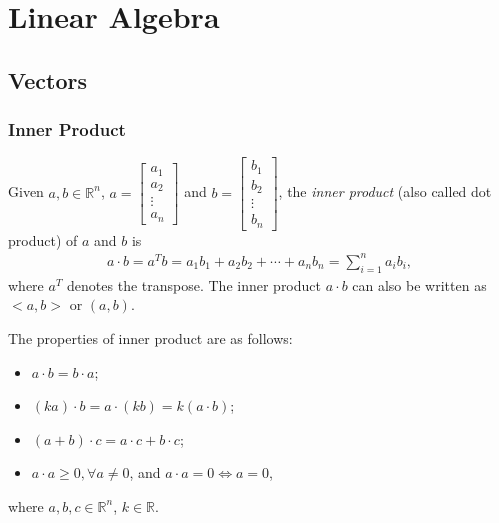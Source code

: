 \section*{Linear Algebra}
\subsection*{Vectors}
\subsubsection*{Inner Product}
Given $a, b \in \mathbb{R}^n$,
$ a = \begin{bmatrix}
a_1 \\
a_2  \\
\vdots \\
a_n
\end{bmatrix}$ and
$ b = \begin{bmatrix}
b_1 \\
b_2 \\
\vdots \\
b_n
\end{bmatrix}$, the \emph{inner product} (also called dot product) of $a$ and $b$ is
\begin{align*}
a \cdot b = a^T b = a_1 b_1 + a_2 b_2 + \cdots + a_n b_n = \sum_{i=1}^n a_i b_i,
\end{align*}
where $a^T$ denotes the transpose. The inner product $a \cdot b$ can also be written as $<a, b>$ or $(a, b)$.

The properties of inner product are as follows:
\begin{itemize}
  \item $a \cdot b = b \cdot a$;
  \item $(k a) \cdot b  =  a \cdot (k b) =k (a \cdot b)$;
  \item $(a+b) \cdot c = a \cdot c  + b \cdot c $;
  \item $a \cdot a \geq 0, \forall a \neq 0$, and $ a \cdot a = 0 \iff a = 0$,
\end{itemize}
where $a, b, c \in \mathbb{R}^n$, $k \in \mathbb{R}$.


